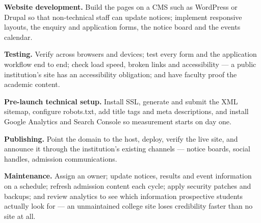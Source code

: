 \begin{qlist}
\begin{apts}
\item \textbf{Website development.} Build the pages on a CMS such as WordPress
      or Drupal so that non-technical staff can update notices; implement
      responsive layouts, the enquiry and application forms, the notice board
      and the events calendar.
\item \textbf{Testing.} Verify across browsers and devices; test every form and
      the application workflow end to end; check load speed, broken links and
      accessibility --- a public institution's site has an accessibility
      obligation; and have faculty proof the academic content.
\item \textbf{Pre-launch technical setup.} Install SSL, generate and submit the
      XML sitemap, configure robots.txt, add title tags and meta descriptions,
      and install Google Analytics and Search Console so measurement starts on
      day one.
\item \textbf{Publishing.} Point the domain to the host, deploy, verify the live
      site, and announce it through the institution's existing channels ---
      notice boards, social handles, admission communications.
\item \textbf{Maintenance.} Assign an owner; update notices, results and event
      information on a schedule; refresh admission content each cycle; apply
      security patches and backups; and review analytics to see which
      information prospective students actually look for --- an unmaintained
      college site loses credibility faster than no site at all.
\end{apts}


\end{qlist}
